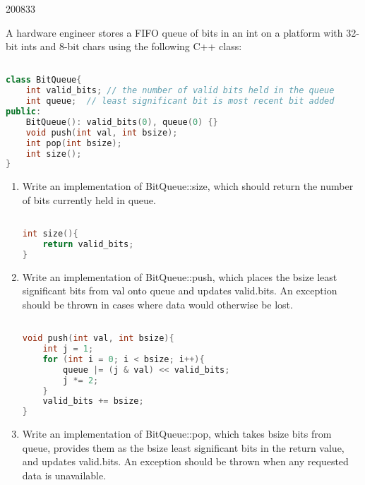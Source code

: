 \documentclass[10pt,\jkfside,a4paper]{article}
\begin{document}
\begin{examquestion}{2008}{3}{3}

A hardware engineer stores a FIFO queue of bits in an int on a platform with
32-bit ints and 8-bit chars using the following C++ class:

\begin{lstlisting}[language=C++]

class BitQueue{
	int valid_bits;	// the number of valid bits held in the queue
	int queue;	// least significant bit is most recent bit added
public:
	BitQueue(): valid_bits(0), queue(0) {}
	void push(int val, int bsize);
	int pop(int bsize);
	int size();
}

\end{lstlisting}

\begin{enumerate}[label=(\alph*)]

\item Write an implementation of BitQueue::size, which should return the
number of bits currently held in queue.

\begin{lstlisting}[language=C++]

int size(){
	return valid_bits;
}

\end{lstlisting}

\item Write an implementation of BitQueue::push, which places the bsize
least significant bits from val onto queue and updates valid.bits. An
exception should be thrown in cases where data would otherwise be lost.


\begin{lstlisting}[language=C++]

void push(int val, int bsize){
	int j = 1;
	for (int i = 0; i < bsize; i++){
		queue |= (j & val) << valid_bits;
		j *= 2;
	}
	valid_bits += bsize;
}

\end{lstlisting}

\item Write an implementation of BitQueue::pop, which takes bsize bits from
queue, provides them as the bsize least significant bits in the return
value, and updates valid.bits. An exception should be thrown when any
requested data is unavailable.


\begin{lstlisting}[language=C++]


\end{lstlisting}
\end{enumerate}
\end{examquestion}
\end{document}
